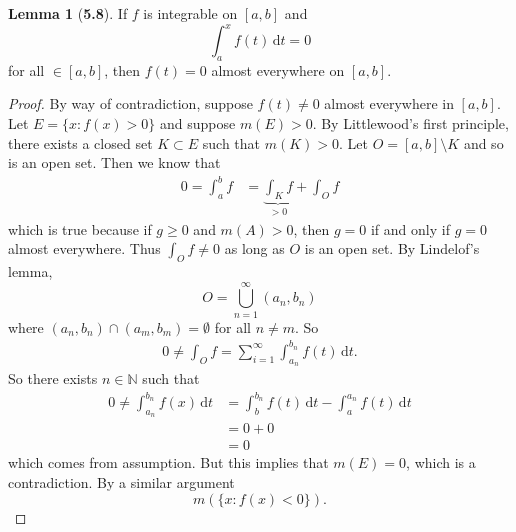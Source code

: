 \documentclass[12pt]{article}
\newcommand{\N}{\mathbb{N}}
\newcommand{\dif}{\, \mathrm{d}}
\theoremstyle{definition}
\newtheorem*{lemma}{Lemma}
\begin{document}
\begin{lemma}[\textbf{5.8}]

    If \( f \) is integrable on \( [a,b] \) and
        \[
            \int_{a}^{x} f(t) \dif t = 0 
        \]
    for all \(  \in [a,b] \), then \( f(t) = 0 \) almost everywhere on \( [a,b] \).

        \begin{proof}
            By way of contradiction, suppose \( f(t) \neq 0 \) almost everywhere in \( [a,b] \). Let \( E = \{ x: f(x) > 0 \} \) and suppose \( m(E) > 0 \). By Littlewood's first principle, there exists a closed set \( K \subset E\) such that \( m(K) > 0 \). Let \( O = [a,b] \setminus K \) and so is an open set. Then we know that    
                \begin{align*}
                    0  = \int_{a}^{b} f &= \underbrace{\int_{K} f}_{> 0} + \int_{O} f 
                \end{align*}
            which is true because if \( g \geq 0 \) and \( m(A) > 0 \), then \( \displaystyle g = 0 \) if and only if \( g = 0 \) almost everywhere. 
            Thus \( \displaystyle \int_{O} f \neq 0 \) as long as \( O \) is an open set. By Lindelof's lemma, 
                \[
                    O = \bigcup_{n=1}^{\infty} (a_n, b_n)  
                \]
            where \( (a_n, b_n) \cap (a_m, b_m) = \emptyset \) for all \( n \neq m \). So
                \begin{align*}
                    0 \neq \int_{O} f = \sum_{i=1}^{\infty} \int_{a_n}^{b_n} f(t) \dif t.
                \end{align*}
            So there exists \( n \in \N \) such that 
                \begin{align*}
                    0 \neq \int_{a_n}^{b_n} f(x) \dif t &= \int_{b}^{b_n}f(t) \dif t - \int_{a}^{a_n} f(t) \dif t \\
                    &= 0 + 0 \\
                    &= 0
                \end{align*}
            which comes from assumption. But this implies that \( m(E) = 0 \), which is a contradiction. By a similar argument
                \[
                    m\left( \{ x: f(x) < 0 \} \right).
                \]
        \end{proof}
    
\end{lemma}
\end{document}
